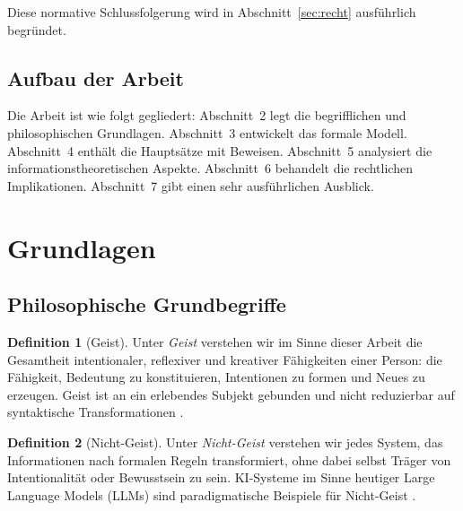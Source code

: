 ﻿\documentclass[a4paper,12pt]{article}
\theoremstyle{definition}
\newtheorem{definition}{Definition}
\begin{document}
\noindent Diese normative Schlussfolgerung wird in Abschnitt~\ref{sec:recht} ausführlich
begründet.

\subsection{Aufbau der Arbeit}

Die Arbeit ist wie folgt gegliedert: Abschnitt~2 legt die begrifflichen und philosophischen
Grundlagen. Abschnitt~3 entwickelt das formale Modell. Abschnitt~4 enthält die Hauptsätze mit
Beweisen. Abschnitt~5 analysiert die informationstheoretischen Aspekte. Abschnitt~6 behandelt
die rechtlichen Implikationen. Abschnitt~7 gibt einen sehr ausführlichen Ausblick.

\section{Grundlagen}

\subsection{Philosophische Grundbegriffe}

\begin{definition}[Geist]
\label{def:geist}
Unter \emph{Geist} verstehen wir im Sinne dieser Arbeit die Gesamtheit intentionaler,
reflexiver und kreativer Fähigkeiten einer Person: die Fähigkeit, Bedeutung zu konstituieren,
Intentionen zu formen und Neues zu erzeugen. Geist ist an ein erlebendes Subjekt gebunden
und nicht reduzierbar auf syntaktische Transformationen \cite{searle1980minds}.
\end{definition}

\begin{definition}[Nicht-Geist]
\label{def:nichtgeist}
Unter \emph{Nicht-Geist} verstehen wir jedes System, das Informationen nach formalen Regeln
transformiert, ohne dabei selbst Träger von Intentionalität oder Bewusstsein zu sein. KI-Systeme
im Sinne heutiger Large Language Models (LLMs) sind paradigmatische Beispiele für
Nicht-Geist \cite{turing1950computing}.
\end{definition}
\end{document}
